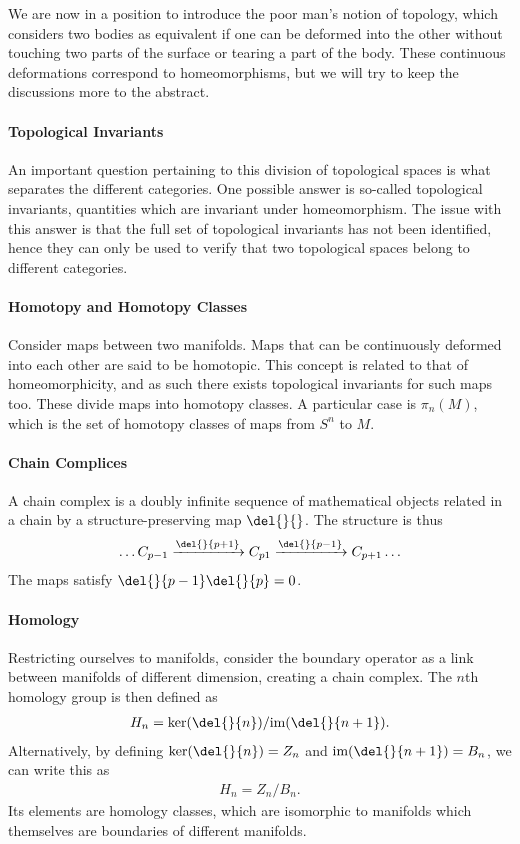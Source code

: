 We are now in a position to introduce the poor man's notion of topology, which considers two bodies as equivalent if one can be deformed into the other without touching two parts of the surface or tearing a part of the body. These continuous deformations correspond to homeomorphisms, but we will try to keep the discussions more to the abstract.

\paragraph{Topological Invariants}
An important question pertaining to this division of topological spaces is what separates the different categories. One possible answer is so-called topological invariants, quantities which are invariant under homeomorphism. The issue with this answer is that the full set of topological invariants has not been identified, hence they can only be used to verify that two topological spaces belong to different categories.

\paragraph{Homotopy and Homotopy Classes}
Consider maps between two manifolds. Maps that can be continuously deformed into each other are said to be homotopic. This concept is related to that of homeomorphicity, and as such there exists topological invariants for such maps too. These divide maps into homotopy classes. A particular case is $\pi_{n}(M)$, which is the set of homotopy classes of maps from $S^{n}$ to $M$.

\paragraph{Chain Complices}
A chain complex is a doubly infinite sequence of mathematical objects related in a chain by a structure-preserving map $\del{}{}$. The structure is thus
\begin{align*}
	\dots C_{p - 1} \xrightarrow{\del{}{p + 1}} C_{p 1} \xrightarrow{\del{}{p - 1}} C_{p + 1} \dots
\end{align*}
The maps satisfy $\del{}{p - 1}\del{}{p} = 0$.

\paragraph{Homology}
Restricting ourselves to manifolds, consider the boundary operator as a link between manifolds of different dimension, creating a chain complex. The $n$th homology group is then defined as
\begin{align*}
	H_{n} = \ker(\del{}{n}) / \text{im}(\del{}{n + 1}).
\end{align*}
Alternatively, by defining $\ker(\del{}{n}) = Z_{n}$ and $\text{im}(\del{}{n + 1}) = B_{n}$, we can write this as
\begin{align*}
	H_{n} = Z_{n} / B_{n}.
\end{align*}
Its elements are homology classes, which are isomorphic to manifolds which themselves are boundaries of different manifolds.

